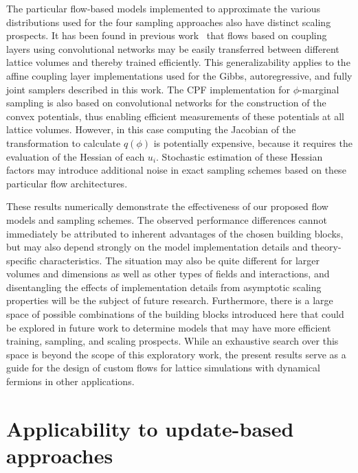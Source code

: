 \documentclass[aps,prd,twocolumn,nofootinbib,superscriptaddress,preprintnumbers]{revtex4-1}
\begin{document}
The particular flow-based models implemented to approximate the various distributions used for the four sampling approaches also have distinct scaling prospects. It has been found in previous work~\cite{Boyda:2020hsi} that flows based on coupling layers using convolutional networks may be easily transferred between different lattice volumes and thereby trained efficiently. This generalizability applies to the affine coupling layer implementations used for the Gibbs, autoregressive, and fully joint samplers described in this work. The CPF implementation for $\phi$-marginal sampling is also based on convolutional networks for the construction of the convex potentials, thus enabling efficient measurements of these potentials at all lattice volumes. However, in this case computing the Jacobian of the transformation to calculate $q(\phi)$ is potentially expensive, because it requires the evaluation of the Hessian of each $u_i$. Stochastic estimation of these Hessian factors may introduce additional noise in exact sampling schemes based on these particular flow architectures.

These results numerically demonstrate the effectiveness of our proposed flow models and sampling schemes. The observed performance differences cannot immediately be attributed to inherent advantages of the chosen building blocks, but may also depend strongly on the model implementation details and theory-specific characteristics. The situation may also be quite different for larger volumes and dimensions as well as other types of fields and interactions, and disentangling the effects of implementation details from asymptotic scaling properties will be the subject of future research. Furthermore, there is a large space of possible combinations of the building blocks introduced here that could be explored in future work to determine models that may have more efficient training, sampling, and scaling prospects. While an exhaustive search over this space is beyond the scope of this exploratory work, the present results serve as a guide for the design of custom flows for lattice simulations with dynamical fermions in other applications.


\section{Applicability to update-based approaches}
\label{sec:update}
\end{document}
